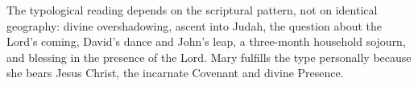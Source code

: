 The typological reading depends on the scriptural pattern, not on identical
geography: divine overshadowing, ascent into Judah, the question about the
Lord's coming, David's dance and John's leap, a three-month household sojourn,
and blessing in the presence of the Lord.  Mary fulfills the type personally
because she bears Jesus Christ, the incarnate Covenant and divine Presence.
